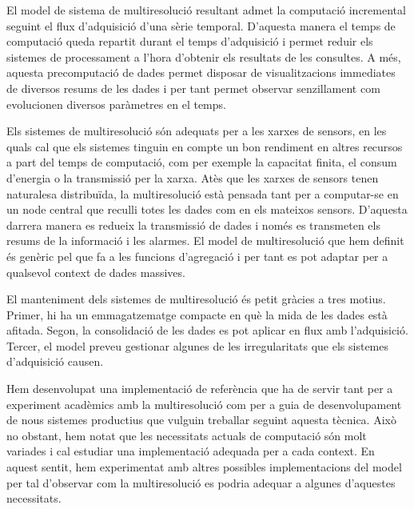 \documentclass{scrartcl}
\begin{document}
El model de sistema de multiresolució resultant admet la computació
incremental seguint el flux d'adquisició d'una sèrie
temporal. D'aquesta manera el temps de computació queda repartit
durant el temps d'adquisició i permet reduir els sistemes de
processament a l'hora d'obtenir els resultats de les consultes.  A
més, aquesta precomputació de dades permet disposar de
visualitzacions immediates de diversos resums de les dades i per tant
permet observar senzillament  com evolucionen
diversos paràmetres en el temps.

Els sistemes de multiresolució són adequats per a les xarxes de
sensors, en les quals cal que els sistemes tinguin en compte un bon
rendiment en altres recursos a part del temps de computació, com per
exemple la capacitat finita, el consum d'energia o la transmissió per
la xarxa.  Atès que les xarxes de sensors tenen naturalesa
distribuïda, la multiresolució està pensada tant per a computar-se en
un node central que reculli totes les dades com en els mateixos
sensors. D'aquesta darrera manera es redueix la transmissió de dades i
només es transmeten els resums de la informació i les alarmes.  El
model de multiresolució que hem definit és genèric pel que fa a les
funcions d'agregació i per tant es pot adaptar per a qualsevol context
de dades massives.


El manteniment dels sistemes de multiresolució és petit gràcies a
tres motius. Primer, hi ha un emmagatzematge
compacte en què la mida de les dades està afitada. Segon, la
consolidació de les dades es pot aplicar en flux amb
l'adquisició. Tercer, el model preveu  gestionar algunes
de les irregularitats que els sistemes d'adquisició causen.

Hem desenvolupat una implementació de referència que ha de servir tant
per a experiment acadèmics amb la multiresolució com per a guia de
desenvolupament de nous sistemes productius que vulguin treballar
seguint aquesta tècnica.  Això no obstant, hem notat que les
necessitats actuals de computació són molt variades i cal estudiar una
implementació adequada per a cada context. En aquest sentit, hem
experimentat amb altres possibles implementacions del model per tal
d'observar com la multiresolució es podria adequar a algunes
d'aquestes necessitats.
\end{document}
